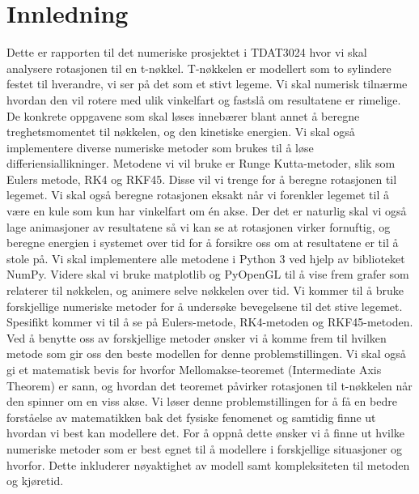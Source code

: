 \section{Innledning}
Dette er rapporten til det numeriske prosjektet i TDAT3024 hvor vi skal analysere rotasjonen til en t-nøkkel. T-nøkkelen er modellert som to sylindere festet til hverandre, vi ser på det som et stivt legeme. Vi skal numerisk tilnærme hvordan den vil rotere med ulik vinkelfart og fastslå om resultatene er rimelige.
\newline\newline
De konkrete oppgavene som skal løses innebærer blant annet å beregne treghetsmomentet til nøkkelen, og den kinetiske energien. Vi skal også implementere diverse numeriske metoder som brukes til å løse differiensiallikninger. Metodene vi vil bruke er Runge Kutta-metoder, slik som Eulers metode, RK4 og RKF45. Disse vil vi trenge for å beregne rotasjonen til legemet. Vi skal også beregne rotasjonen eksakt når vi forenkler legemet til å være en kule som kun har vinkelfart om én akse. Der det er naturlig skal vi også lage animasjoner av resultatene så vi kan se at rotasjonen virker fornuftig, og beregne energien i systemet over tid for å forsikre oss om at resultatene er til å stole på.
\newline\newline
Vi skal implementere alle metodene i Python 3 ved hjelp av biblioteket NumPy. Videre skal vi bruke matplotlib og PyOpenGL til å vise frem grafer som relaterer til nøkkelen, og animere selve nøkkelen over tid.
\newline\newline
Vi kommer til å bruke forskjellige numeriske metoder for å undersøke bevegelsene til det stive legemet. Spesifikt kommer vi til å se på Eulers-metode, RK4-metoden og RKF45-metoden. Ved å benytte oss av forskjellige metoder ønsker vi å komme frem til hvilken metode som gir oss den beste modellen for denne problemstillingen. Vi skal også gi et matematisk bevis for hvorfor Mellomakse-teoremet (Intermediate Axis Theorem) er sann, og hvordan det teoremet påvirker rotasjonen til t-nøkkelen når den spinner om en viss akse.
\newline\newline
Vi løser denne problemstillingen for å få en bedre forståelse av matematikken bak det fysiske fenomenet og samtidig finne ut hvordan vi best kan modellere det. For å oppnå dette ønsker vi å finne ut hvilke numeriske metoder som er best egnet til å modellere i forskjellige situasjoner og hvorfor. Dette inkluderer nøyaktighet av modell samt kompleksiteten til metoden og kjøretid. 